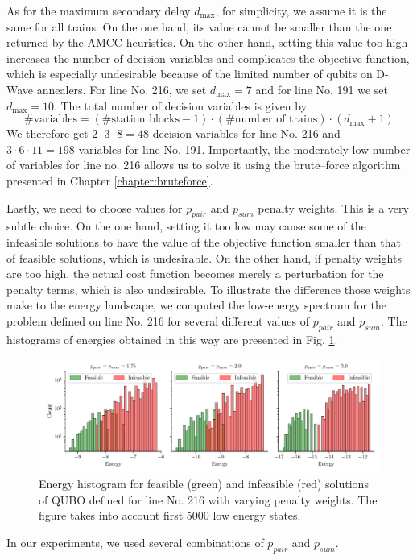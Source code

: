 As for the maximum secondary delay $d_{\max}$, for simplicity, we assume it is
the same for all trains. On the one hand, its value cannot be smaller than the
one returned by the AMCC heuristics. On the other hand, setting this value too
high increases the number of decision variables and complicates the objective
function, which is especially undesirable because of the limited number of
qubits on D-Wave annealers. For line No. 216, we set $d_{\max}=7$ and for line
No. 191 we set $d_{\max}=10$. The total number of decision variables is given
by
\begin{equation}
  \mbox{\#variables} = (\mbox{\#station blocks}-1) \cdot (\mbox{\#number of trains}) \cdot (d_{\max}+1)
\end{equation}
We therefore get $2\cdot 3 \cdot 8 = 48$ decision variables for line No. 216
and $3 \cdot 6 \cdot 11 = 198$ variables for line No. 191. Importantly, the
moderately low number of variables for line no. 216 allows us to solve it using
the brute--force algorithm presented in Chapter \ref{chapter:bruteforce}.

Lastly, we need to choose values for $p_{pair}$ and $p_{sum}$ penalty weights.
This is a very subtle choice. On the one hand, setting it too low may cause
some of the infeasible solutions to have the value of the objective function
smaller than that of feasible solutions, which is undesirable. On the other
hand, if penalty weights are too high, the actual cost function becomes merely
a perturbation for the penalty terms, which is also undesirable. To illustrate
the difference those weights make to the energy landscape, we computed the
low-energy spectrum for the problem defined on line No. 216 for several
different values of $p_{pair}$ and $p_{sum}$. The histograms of energies
obtained in this way are presented in Fig. \ref{fig:penaltyhistogram}.

\begin{figure}
  \includegraphics[width=\textwidth]{figures/railway_histograms_bf}
  \caption{Energy histogram for feasible (green) and infeasible (red) solutions of QUBO
    defined for line No. 216 with varying penalty weights. The figure takes into
    account first 5000 low energy states.} \label{fig:penaltyhistogram}
\end{figure}
In our experiments, we used several combinations of $p_{pair}$ and $p_{sum}$.

